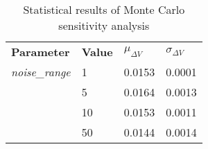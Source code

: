 
                    \begin{table}[]
                    \centering
                    \begin{tabular}{l l l l}
                    \rowcolor[HTML]{EFEFEF} \textbf{Parameter} & \textbf{Value} & \textbf{$\mu_{\Delta V}$} & \textbf{$\sigma_{\Delta V}$} \\
                    \textit{noise\_range} & 1 & 0.0153 & 0.0001 \\
 & 5 & 0.0164 & 0.0013 \\
 & 10 & 0.0153 & 0.0011 \\
 & 50 & 0.0144 & 0.0014 \\

                    \end{tabular}
                    \caption{Statistical results of Monte Carlo sensitivity analysis}
                    \label{tab:SensitivityAnalysis}
                    \end{table}
                    